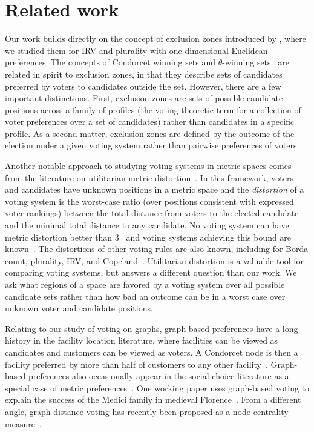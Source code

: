 \documentclass{article}
\theoremstyle{theorem}
\theoremstyle{definition}
\begin{document}
\section{Related work}
Our work builds directly on the concept of exclusion zones introduced by \citet{tomlinson2024moderating}, where we studied them for IRV and plurality with one-dimensional Euclidean preferences. The concepts of Condorcet winning sets and $\theta$-winning sets~\cite{elkind2011choosing,elkind2015condorcet,bloks2018condorcet,charikar2024six} are related in spirit to exclusion zones, in that they describe sets of candidates preferred by voters to candidates outside the set. However, there are a few important distinctions. First, exclusion zones are sets of possible candidate positions across a family of profiles (the voting theoretic term for a collection of voter preferences over a set of candidates) rather than candidates in a specific profile. As a second matter, exclusion zones are defined by the outcome of the election under a given voting system rather than pairwise preferences of voters.

Another notable approach to studying voting systems in metric spaces comes from the literature on utilitarian metric distortion~\cite{procaccia2006distortion,anshelevich2015approximating,anshelevich2018approximating}. In this framework, voters and candidates have unknown positions in a metric space and the \emph{distortion} of a voting system is the worst-case ratio (over positions consistent with expressed voter rankings) between the total distance from voters to the elected candidate and the minimal total distance to any candidate. No voting system can have metric distortion better than 3~\cite{anshelevich2015approximating} and voting systems achieving this bound are known~\cite{gkatzelis2020resolving,kizilkay2022apluralityveto}. The distortions of other voting rules are also known, including for Borda count, plurality, IRV, and Copeland~\cite{anshelevich2018approximating,anagnostides2022dimensionality}. Utilitarian distortion is a valuable tool for comparing voting systems, but answers a different question than our work. We ask what regions of a space are favored by a voting system over all possible candidate sets rather than how bad an outcome can be in a worst case over unknown voter and candidate positions.  

Relating to our study of voting on graphs, graph-based preferences have a long history in the facility location literature, where facilities can be viewed as candidates and customers can be viewed as voters. A Condorcet node is then a facility preferred by more than half of customers to any other facility~\cite{wendell1981new,bandelt1985networks,hansen1986equivalence}. Graph-based preferences also occasionally appear in the social choice literature as a special case of metric preferences~\cite{skowron2017social}. One working paper uses graph-based voting to explain the success of the Medici family in medieval Florence~\cite{telek2016power}. From a different angle, graph-distance voting has recently been proposed as a node centrality measure~\cite{brandes2022voting,skibski2023closeness}. 
\end{document}
